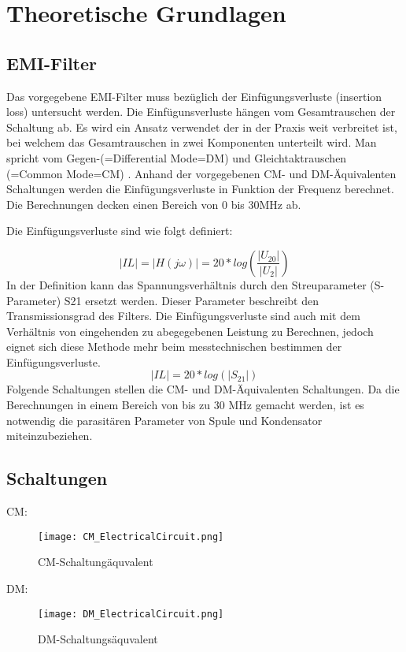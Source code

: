 \section{Theoretische Grundlagen} \label{sec:TheoretischeGrundlagen}

\subsection{EMI-Filter} \label{subsec:emifilter}
Das vorgegebene EMI-Filter muss bezüglich der Einfügungsverluste (insertion loss) untersucht werden. Die Einfügunsverluste hängen vom Gesamtrauschen der Schaltung ab. Es wird ein Ansatz verwendet der in der Praxis weit verbreitet ist, bei welchem das Gesamtrauschen in zwei Komponenten unterteilt wird. Man spricht vom Gegen-(=Differential Mode=DM) und Gleichtaktrauschen (=Common Mode=CM) . Anhand der vorgegebenen CM- und DM-Äquivalenten Schaltungen werden die Einfügungsverluste in Funktion der Frequenz berechnet. Die Berechnungen decken einen Bereich von 0 bis 30MHz ab.

Die Einfügungsverluste sind wie folgt definiert: 

\begin{equation}
\left\lvert IL\right\rvert =\left\lvert H(j\omega) \right\rvert = 20*log(\frac{ \left\lvert U_{20} \right\rvert }{ \left\lvert U_2 \right\rvert })
\end{equation}
In der Definition kann das Spannungsverhältnis durch den Streuparameter (S-Parameter) S21 ersetzt werden. Dieser Parameter beschreibt den Transmissionsgrad des Filters. Die Einfügungsverluste sind auch mit dem Verhältnis von eingehenden zu abegegebenen Leistung zu Berechnen, jedoch eignet sich diese Methode mehr beim messtechnischen bestimmen der Einfügungsverluste. 
\begin{equation}
\left\lvert IL\right\rvert = 20*log (\left\lvert S_{21} \right\rvert)
\end{equation}
Folgende Schaltungen stellen die CM- und DM-Äquivalenten Schaltungen. Da die Berechnungen in einem Bereich von bis zu 30 MHz gemacht werden, ist es notwendig die parasitären Parameter von Spule und Kondensator miteinzubeziehen.
\subsection{Schaltungen} \label{subsec:schaltungen}
CM:
\begin{figure}[H]
	\centering
	\texttt{[image: CM\_ElectricalCircuit.png]}
	\caption{CM-Schaltungäquvalent}
	\label{fig:CM-Schaltungäquvalent}
\end{figure}
DM:
\begin{figure}[H]
	\centering
	\texttt{[image: DM\_ElectricalCircuit.png]}
	\caption{DM-Schaltungsäquvalent}
	\label{fig:DM-Schaltungsäquvalent}
\end{figure}

